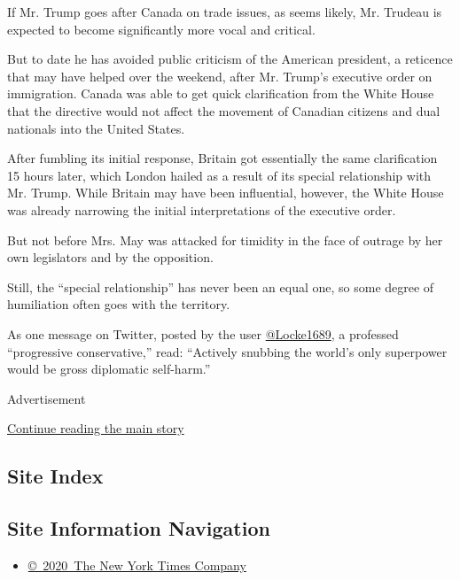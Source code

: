If Mr. Trump goes after Canada on trade issues, as seems likely, Mr.
Trudeau is expected to become significantly more vocal and critical.

But to date he has avoided public criticism of the American president, a
reticence that may have helped over the weekend, after Mr. Trump's
executive order on immigration. Canada was able to get quick
clarification from the White House that the directive would not affect
the movement of Canadian citizens and dual nationals into the United
States.

After fumbling its initial response, Britain got essentially the same
clarification 15 hours later, which London hailed as a result of its
special relationship with Mr. Trump. While Britain may have been
influential, however, the White House was already narrowing the initial
interpretations of the executive order.

But not before Mrs. May was attacked for timidity in the face of outrage
by her own legislators and by the opposition.

Still, the ``special relationship'' has never been an equal one, so some
degree of humiliation often goes with the territory.

As one message on Twitter, posted by the user
\href{https://twitter.com/Locke1689/status/826011324270444544}{@Locke1689},
a professed ``progressive conservative,'' read: ``Actively snubbing the
world's only superpower would be gross diplomatic self-harm.''

Advertisement

\protect\hyperlink{after-bottom}{Continue reading the main story}

\hypertarget{site-index}{%
\subsection{Site Index}\label{site-index}}

\hypertarget{site-information-navigation}{%
\subsection{Site Information
Navigation}\label{site-information-navigation}}

\begin{itemize}
\tightlist
\item
  \href{https://help.nytimes.com/hc/en-us/articles/115014792127-Copyright-notice}{©~2020~The
  New York Times Company}
\end{itemize}


